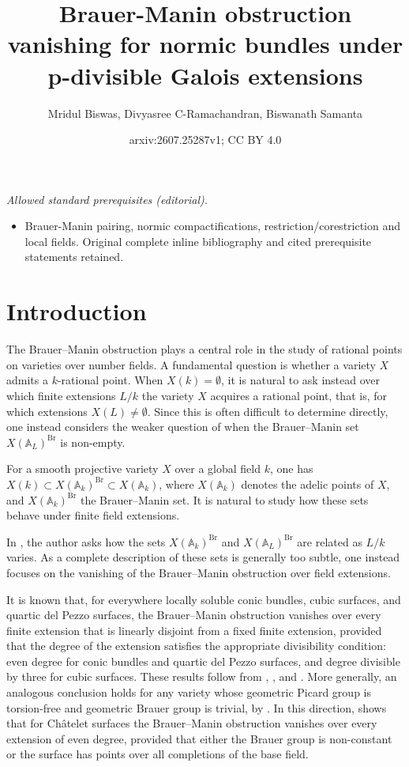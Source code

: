 \documentclass[10pt]{amsart}
\title{Brauer-Manin obstruction vanishing for normic bundles under p-divisible Galois extensions}
\author{Mridul Biswas, Divyasree C-Ramachandran, Biswanath Samanta}
\date{arxiv:2607.25287v1; CC BY 4.0}
\theoremstyle{plain}
\theoremstyle{definition}
\begin{document}
\maketitle
\noindent\textit{Allowed standard prerequisites (editorial).}\begin{itemize}
\item Brauer-Manin pairing, normic compactifications, restriction/corestriction and local fields. Original complete inline bibliography and cited prerequisite statements retained.
\end{itemize}\medskip
\section{Introduction}\label{Introduction}

The Brauer--Manin obstruction plays a central role in the study of rational points on varieties over number fields. A fundamental question is whether a variety \(X\) admits a \(k\)-rational point. When \(X(k)=\emptyset\), it is natural to ask instead over which finite extensions \(L/k\) the variety \(X\) acquires a rational point, that is, for which extensions \(X(L)\neq\emptyset\). Since this is often difficult to determine directly, one instead considers the weaker question of when the Brauer--Manin set $X(\mathbb{A}_L)^{\mathrm{Br}}$ is non-empty.

For a smooth projective variety $X$ over a global field $k$, one has \(X(k) \subset X(\mathbb{A}_k)^{\mathrm{Br}} \subset X(\mathbb{A}_k)\), where $X(\mathbb{A}_k)$ denotes the adelic points of $X$, and $X(\mathbb{A}_k)^{\mathrm{Br}}$ the Brauer--Manin set. It is natural to study how these sets behave under finite field extensions.

In \cite[Section~4]{Vir}, the author asks how the sets $X(\mathbb{A}_k)^{\mathrm{Br}}$ and $X(\mathbb{A}_L)^{\mathrm{Br}}$ are related as $L/k$ varies. As a complete description of these sets is generally too subtle, one instead focuses on the vanishing of the Brauer--Manin obstruction over field extensions.



It is known that, for everywhere locally soluble conic bundles, cubic surfaces, and quartic del Pezzo surfaces, the Brauer--Manin obstruction vanishes over every finite extension that is linearly disjoint from a fixed finite extension, provided that the degree of the extension satisfies the appropriate divisibility condition: even degree for conic bundles and quartic del Pezzo surfaces, and degree divisible by three for cubic surfaces. These results follow from \cite[Lemma~3.1]{CV}, \cite[Corollary~1]{swD}, and \cite[Lemma~3.4, Remark~2]{CTPoo}. More generally, an analogous conclusion holds for any variety whose geometric Picard group is torsion-free and geometric Brauer group is trivial, by \cite[Corollary~3.4]{CV}. In this direction, \cite[Theorem~1.1]{RW} shows that for Ch\^atelet surfaces the Brauer--Manin obstruction vanishes over every extension of even degree, provided that either the Brauer group is non-constant or the surface has points over all completions of the base field.
\end{document}
